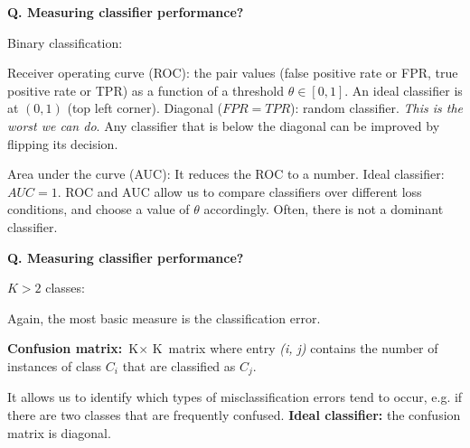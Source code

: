 \begin{frame}[fragile]{\textbf{Q. Measuring classifier performance?}}
  \begin{wideitemize}
  \item Binary classification:\medskip
    \begin{wideitemize}
    \item Receiver operating curve (ROC): the pair values (false positive rate
      or FPR, true positive rate or TPR) as a function of a threshold $\theta \in [0, 1]$.
      {\footnotesize An ideal classifier is at $(0, 1)$ (top left corner). Diagonal ($FPR
        = TPR$): random classifier. \textit{This is the worst we can do}.}
      {\scriptsize Any classifier that is below the diagonal can be improved by flipping its decision.}
    \item Area under the curve (AUC): It reduces the ROC to a number. Ideal
      classifier: $AUC = 1$. {\footnotesize ROC and AUC allow us to compare
        classifiers over different loss conditions, and choose a value of
        $\theta$ accordingly. Often, there is not a dominant classifier.}
    \end{wideitemize}
  \end{wideitemize}
\end{frame}

\begin{frame}[fragile]{\textbf{Q. Measuring classifier performance?}}
  \begin{wideitemize}
  \item $K > 2$ classes:\medskip
    \begin{wideitemize}
    \item Again, the most basic measure is the classification error.
    \item \textbf{Confusion matrix:} $\text{K}\times \text{ K}$ matrix where entry \textit{(i, j)} contains the
      number of instances of class $C_i$ that are classified as $C_j$.
    \item {\footnotesize It allows us to identify which types of misclassification errors tend
        to occur, e.g. if there are two classes that are frequently confused.
        \textbf{Ideal classifier:} the confusion matrix is diagonal.}
    \end{wideitemize}
  \end{wideitemize}
\end{frame}


